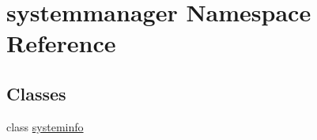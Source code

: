 \hypertarget{namespacesystemmanager}{}\section{systemmanager Namespace Reference}
\label{namespacesystemmanager}
\subsection*{Classes}
\begin{DoxyCompactItemize}
\item 
class \hyperlink{classsystemmanager_1_1systeminfo}{systeminfo}
\end{DoxyCompactItemize}
